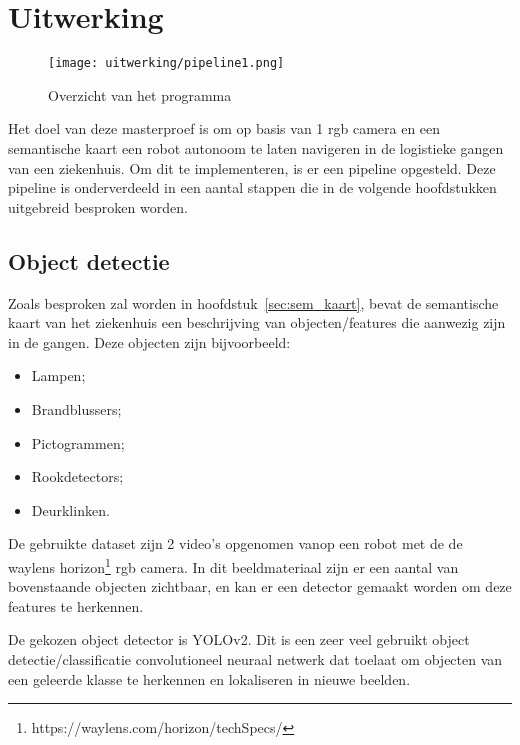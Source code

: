 
\chapter{Uitwerking}

\begin{figure}[!h]
    \centering
    \texttt{[image: uitwerking/pipeline1.png]}
    \caption{Overzicht van het programma}
    \label{fig:pipeline1}
\end{figure}

Het doel van deze masterproef is om op basis van 1 \gls{rgb} camera en een semantische kaart een robot autonoom te laten navigeren in de logistieke gangen van een ziekenhuis.
Om dit te implementeren, is er een pipeline opgesteld. Deze pipeline is onderverdeeld in een aantal stappen die in de volgende hoofdstukken uitgebreid besproken worden.


\section{Object detectie}\label{sec:object_detectie}

Zoals besproken zal worden in hoofdstuk~\ref{sec:sem_kaart}, bevat de semantische kaart van het ziekenhuis een beschrijving van objecten/features die aanwezig zijn in de gangen.
Deze objecten zijn bijvoorbeeld:
\begin{itemize}
    \item Lampen;
    \item Brandblussers;
    \item Pictogrammen;
    \item Rookdetectors;
    \item Deurklinken.
\end{itemize}

De gebruikte dataset zijn 2 video's opgenomen vanop een robot met de de waylens horizon\footnote{https://waylens.com/horizon/techSpecs/} \gls{rgb} camera.
In dit beeldmateriaal zijn er een aantal van bovenstaande objecten zichtbaar, en kan er een detector gemaakt worden om deze features te herkennen.

De gekozen object detector is YOLOv2\cite{yolov22016}. Dit is een zeer veel gebruikt object detectie/classificatie convolutioneel neuraal netwerk dat toelaat om
objecten van een geleerde klasse te herkennen en lokaliseren in nieuwe beelden.


